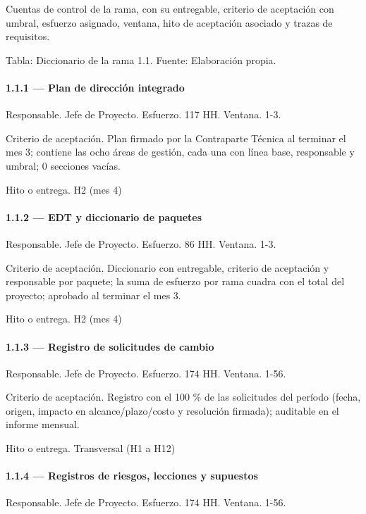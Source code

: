 \documentclass[11pt]{article}
\begin{document}
Cuentas de control de la rama, con su entregable, criterio de aceptación con umbral, esfuerzo asignado, ventana, hito de aceptación asociado y trazas de requisitos.

Tabla: Diccionario de la rama 1.1. Fuente: Elaboración propia.

\paragraph{1.1.1 — Plan de dirección integrado}

Responsable. Jefe de Proyecto. Esfuerzo. 117 HH. Ventana. 1-3.

Criterio de aceptación. Plan firmado por la Contraparte Técnica al terminar el mes 3; contiene las ocho áreas de gestión, cada una con línea base, responsable y umbral; 0 secciones vacías.

Hito o entrega. H2 (mes 4)

\paragraph{1.1.2 — EDT y diccionario de paquetes}

Responsable. Jefe de Proyecto. Esfuerzo. 86 HH. Ventana. 1-3.

Criterio de aceptación. Diccionario con entregable, criterio de aceptación y responsable por paquete; la suma de esfuerzo por rama cuadra con el total del proyecto; aprobado al terminar el mes 3.

Hito o entrega. H2 (mes 4)

\paragraph{1.1.3 — Registro de solicitudes de cambio}

Responsable. Jefe de Proyecto. Esfuerzo. 174 HH. Ventana. 1-56.

Criterio de aceptación. Registro con el 100 \% de las solicitudes del período (fecha, origen, impacto en alcance/plazo/costo y resolución firmada); auditable en el informe mensual.

Hito o entrega. Transversal (H1 a H12)

\paragraph{1.1.4 — Registros de riesgos, lecciones y supuestos}

Responsable. Jefe de Proyecto. Esfuerzo. 174 HH. Ventana. 1-56.
\end{document}
